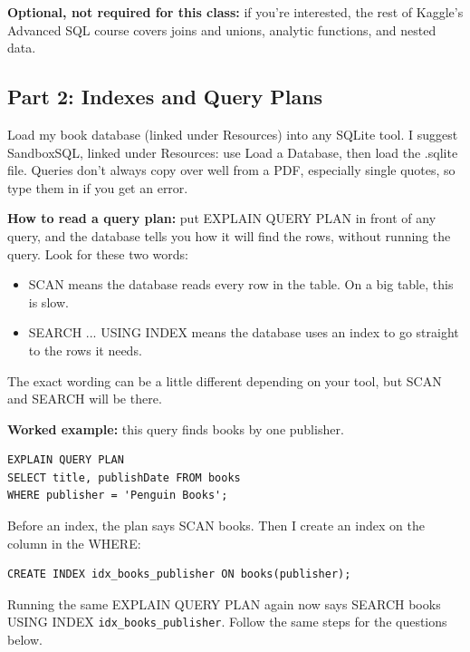 \documentclass[12pt]{article}
\begin{document}
\textbf{Optional, not required for this class:} if you're interested, the rest of Kaggle's Advanced SQL course covers joins and unions, analytic functions, and nested data.

\subsection*{Part 2: Indexes and Query Plans}
Load my book database (linked under Resources) into any SQLite tool. I suggest SandboxSQL, linked under Resources: use Load a Database, then load the .sqlite file. Queries don't always copy over well from a PDF, especially single quotes, so type them in if you get an error.

\textbf{How to read a query plan:} put EXPLAIN QUERY PLAN in front of any query, and the database tells you how it will find the rows, without running the query. Look for these two words:
\begin{itemize}
    \item SCAN means the database reads every row in the table. On a big table, this is slow.
    \item SEARCH ... USING INDEX means the database uses an index to go straight to the rows it needs.
\end{itemize}
The exact wording can be a little different depending on your tool, but SCAN and SEARCH will be there.

\textbf{Worked example:} this query finds books by one publisher.
\begin{Verbatim}
EXPLAIN QUERY PLAN
SELECT title, publishDate FROM books
WHERE publisher = 'Penguin Books';
\end{Verbatim}
Before an index, the plan says SCAN books. Then I create an index on the column in the WHERE:
\begin{Verbatim}
CREATE INDEX idx_books_publisher ON books(publisher);
\end{Verbatim}
Running the same EXPLAIN QUERY PLAN again now says SEARCH books USING INDEX \nolinkurl{idx_books_publisher}. Follow the same steps for the questions below.
\end{document}
